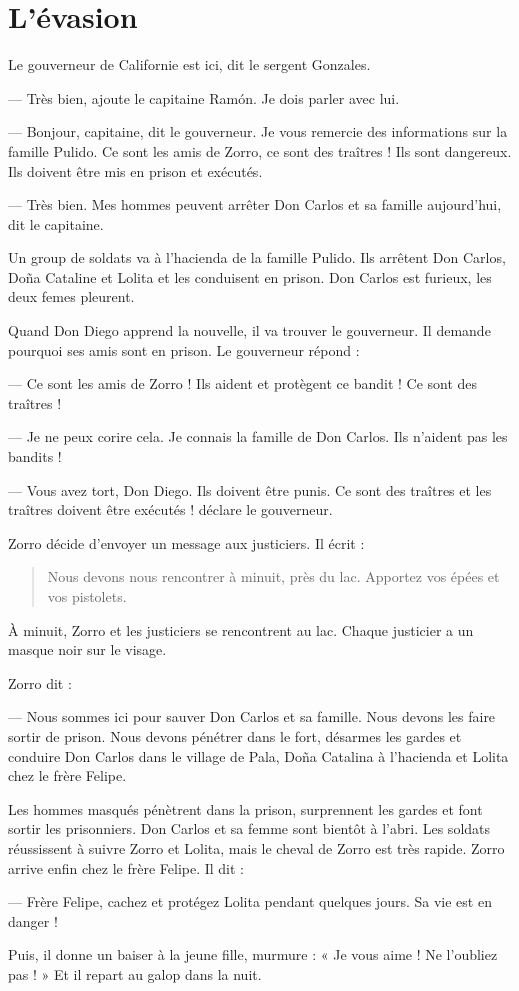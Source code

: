 \chapter{L'évasion}
Le gouverneur de Californie est ici, dit le sergent Gonzales.

--- Très bien, ajoute le capitaine Ramón. Je dois parler avec lui.

--- Bonjour, capitaine, dit le gouverneur. Je vous remercie des informations sur la famille Pulido. Ce sont les amis de Zorro, ce
    sont des traîtres ! Ils sont dangereux. Ils doivent être mis en prison et exécutés.

--- Très bien. Mes hommes peuvent arrêter Don Carlos et sa famille aujourd'hui, dit le capitaine.

Un group de soldats va à l'hacienda de la famille Pulido. Ils arrêtent Don Carlos, Doña Cataline et Lolita et les conduisent en
prison. Don Carlos est furieux, les deux femes pleurent.

Quand Don Diego apprend la nouvelle, il va trouver le gouverneur. Il demande pourquoi ses amis sont en prison. Le gouverneur
répond :

--- Ce sont les amis de Zorro ! Ils aident et protègent ce bandit ! Ce sont des traîtres !

--- Je ne peux corire cela. Je connais la famille de Don Carlos. Ils n'aident pas les bandits !

--- Vous avez tort, Don Diego. Ils doivent être punis. Ce sont des traîtres et les traîtres doivent être exécutés ! déclare le
    gouverneur.

Zorro décide d'envoyer un message aux justiciers. Il écrit :

\begin{quote}
Nous devons nous rencontrer à minuit, près du lac. Apportez vos épées et vos pistolets.
\end{quote}

À minuit, Zorro et les justiciers se rencontrent au lac. Chaque justicier a un masque noir sur le visage.

Zorro dit :

--- Nous sommes ici pour sauver Don Carlos et sa famille. Nous devons les faire sortir de prison. Nous devons pénétrer dans le
    fort, désarmes les gardes et conduire Don Carlos dans le village de Pala, Doña Catalina à l'hacienda et Lolita chez le frère
    Felipe.

Les hommes masqués pénètrent dans la prison, surprennent les gardes et font sortir les prisonniers. Don Carlos et sa femme sont
bientôt à l'abri. Les soldats réussissent à suivre Zorro et Lolita, mais le cheval de Zorro est très rapide. Zorro arrive enfin
chez le frère Felipe. Il dit :

--- Frère Felipe, cachez et protégez Lolita pendant quelques jours. Sa vie est en danger !

Puis, il donne un baiser à la jeune fille, murmure : « Je vous aime ! Ne l'oubliez pas ! » Et il repart au galop dans la nuit.
